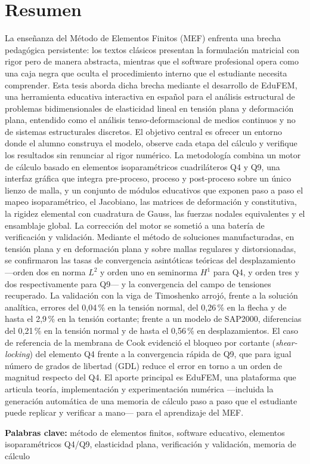 \chapter*{Resumen}

La enseñanza del Método de Elementos Finitos (MEF) enfrenta una brecha pedagógica persistente: los textos clásicos presentan la formulación matricial con rigor pero de manera abstracta, mientras que el software profesional opera como una caja negra que oculta el procedimiento interno que el estudiante necesita comprender. Esta tesis aborda dicha brecha mediante el desarrollo de EduFEM, una herramienta educativa interactiva en español para el análisis estructural de problemas bidimensionales de elasticidad lineal en tensión plana y deformación plana, entendido como el análisis tenso-deformacional de medios continuos y no de sistemas estructurales discretos. El objetivo central es ofrecer un entorno donde el alumno construya el modelo, observe cada etapa del cálculo y verifique los resultados sin renunciar al rigor numérico. La metodología combina un motor de cálculo basado en elementos isoparamétricos cuadriláteros Q4 y Q9, una interfaz gráfica que integra pre-proceso, proceso y post-proceso sobre un único lienzo de malla, y un conjunto de módulos educativos que exponen paso a paso el mapeo isoparamétrico, el Jacobiano, las matrices de deformación y constitutiva, la rigidez elemental con cuadratura de Gauss, las fuerzas nodales equivalentes y el ensamblaje global. La corrección del motor se sometió a una batería de verificación y validación. Mediante el método de soluciones manufacturadas, en tensión plana y en deformación plana y sobre mallas regulares y distorsionadas, se confirmaron las tasas de convergencia asintóticas teóricas del desplazamiento —orden dos en norma $L^2$ y orden uno en seminorma $H^1$ para Q4, y orden tres y dos respectivamente para Q9— y la convergencia del campo de tensiones recuperado. La validación con la viga de Timoshenko arrojó, frente a la solución analítica, errores del 0,04\,\% en la tensión normal, del 0,26\,\% en la flecha y de hasta el 2,9\,\% en la tensión cortante; frente a un modelo de SAP2000, diferencias del 0,21\,\% en la tensión normal y de hasta el 0,56\,\% en desplazamientos. El caso de referencia de la membrana de Cook evidenció el bloqueo por cortante (\emph{shear-locking}) del elemento Q4 frente a la convergencia rápida de Q9, que para igual número de grados de libertad (GDL) reduce el error en torno a un orden de magnitud respecto del Q4. El aporte principal es EduFEM, una plataforma que articula teoría, implementación y experimentación numérica —incluida la generación automática de una memoria de cálculo paso a paso que el estudiante puede replicar y verificar a mano— para el aprendizaje del MEF.

\noindent\textbf{Palabras clave:} método de elementos finitos, software educativo, elementos isoparamétricos Q4/Q9, elasticidad plana, verificación y validación, memoria de cálculo
